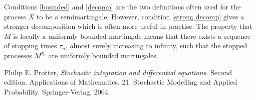 \documentclass[12pt]{article}
\begin{document}
Conditions \ref{bounded} and \ref{decomp} are the two definitions often used for the process $X$ to be a semimartingale.
However, condition \ref{strong decomp} gives a stronger decomposition which is often more useful in practise. The property that $M$ is locally a uniformly bounded martingale means that there exists a sequence of stopping times $\tau_n$, almost surely increasing to infinity, such that the stopped processes $M^{\tau_n}$ are uniformly bounded martingales.

\begin{thebibliography}{9}
Philip E. Protter, \emph{Stochastic integration and differential equations.} Second edition. Applications of Mathematics, 21. Stochastic Modelling and Applied Probability. Springer-Verlag, 2004.
\end{thebibliography}

\end{document}
